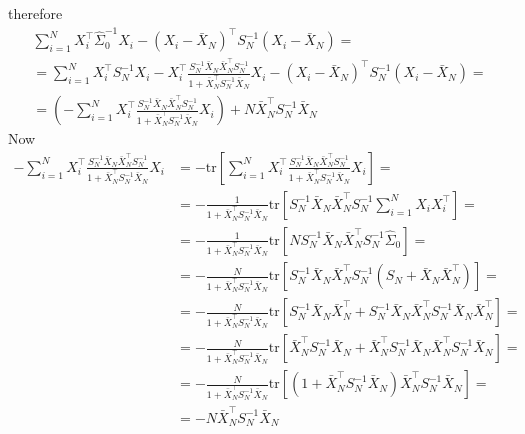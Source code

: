\documentclass[10pt,notitlepage]{article}
\newcommand{\tr}[1]{\text{tr}\left[#1\right]}
\begin{document}
\begin{exercise}[Solution]
\begin{enumerate}[(a)]
                    therefore
                    \begin{gather*}
                        \sum_{i=1}^{N} X_i^\top\hat{\Sigma}_0^{-1}X_i - \left(X_i-\bar{X}_N\right)^\top S_N^{-1}\left(X_i-\bar{X}_N\right) =\\
                        = \sum_{i=1}^{N} X_i^\top S_N^{-1}X_i - X_i^\top \frac{S_N^{-1}\bar{X}_N \bar{X}_N^\top S_N^{-1}}{1+ \bar{X}_N^\top S_N^{-1}\bar{X}_N} X_i - \left(X_i-\bar{X}_N\right)^\top S_N^{-1}\left(X_i-\bar{X}_N\right) = \\
                        = \left(-\sum_{i=1}^{N} X_i^\top \frac{S_N^{-1}\bar{X}_N \bar{X}_N^\top S_N^{-1}}{1+ \bar{X}_N^\top S_N^{-1}\bar{X}_N} X_i\right) + N  \bar{X}_N^\top S_N^{-1}\bar{X}_N
                    \end{gather*}
                    Now
                    \begin{align*}
                        -\sum_{i=1}^{N} X_i^\top \frac{S_N^{-1}\bar{X}_N \bar{X}_N^\top S_N^{-1}}{1+ \bar{X}_N^\top S_N^{-1}\bar{X}_N} X_i &= - \tr{\sum_{i=1}^{N}X_i^\top \frac{S_N^{-1}\bar{X}_N \bar{X}_N^\top S_N^{-1}}{1+ \bar{X}_N^\top S_N^{-1}\bar{X}_N} X_i} =\\
                        &= -\frac{1}{1+ \bar{X}_N^\top S_N^{-1}\bar{X}_N}\tr{S_N^{-1}\bar{X}_N \bar{X}_N^\top S_N^{-1} \sum_{i=1}^{N}X_i X_i^\top} =\\
                        &= -\frac{1}{1+ \bar{X}_N^\top S_N^{-1}\bar{X}_N}\tr{N S_N^{-1}\bar{X}_N \bar{X}_N^\top S_N^{-1} \hat{\Sigma}_0} = \\
                        &= -\frac{N}{1+ \bar{X}_N^\top S_N^{-1}\bar{X}_N}\tr{S_N^{-1}\bar{X}_N \bar{X}_N^\top S_N^{-1} \left(S_N + \bar{X}_N \bar{X}_N^\top\right)} = \\
                        &= -\frac{N}{1+ \bar{X}_N^\top S_N^{-1}\bar{X}_N}\tr{S_N^{-1}\bar{X}_N \bar{X}_N^\top + S_N^{-1}\bar{X}_N \bar{X}_N^\top S_N^{-1}\bar{X}_N \bar{X}_N^\top} = \\
                        &= -\frac{N}{1+ \bar{X}_N^\top S_N^{-1}\bar{X}_N}\tr{\bar{X}_N^\top S_N^{-1}\bar{X}_N + \bar{X}_N^\top S_N^{-1}\bar{X}_N\bar{X}_N^\top S_N^{-1}\bar{X}_N} = \\
                        &= -\frac{N}{1+ \bar{X}_N^\top S_N^{-1}\bar{X}_N}\tr{\left(1+\bar{X}_N^\top S_N^{-1}\bar{X}_N\right) \bar{X}_N^\top S_N^{-1}\bar{X}_N} = \\
                        &= -N\bar{X}_N^\top S_N^{-1}\bar{X}_N
                    \end{align*}

\end{enumerate}
\end{exercise}
\end{document}

